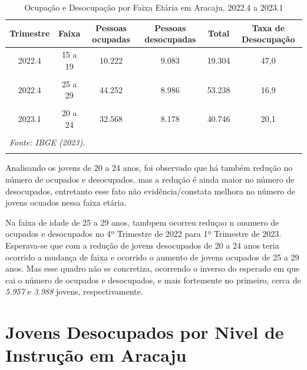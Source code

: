 \documentclass[
  12pt,
  a4paper,
]{article}
\begin{document}
\begin{longtable}[t]{cccccc}
\caption{\label{tab:tab8}\label{tab8}Ocupação e Desocupação por Faixa Etária em Aracaju, 2022.4 a 2023.1}\\
\toprule
Trimestre & Faixa & Pessoas ocupadas & Pessoas desocupadas & Total & Taxa de Desocupação\\
\midrule
2022.4 & 15 a 19 & 10.222 & 9.083 & 19.304 & 47,0\\
\cellcolor[HTML]{DCDCDC}{2022.4} & \cellcolor[HTML]{DCDCDC}{20 a 24} & \cellcolor[HTML]{DCDCDC}{32.571} & \cellcolor[HTML]{DCDCDC}{10.620} & \cellcolor[HTML]{DCDCDC}{43.191} & \cellcolor[HTML]{DCDCDC}{24,6}\\
2022.4 & 25 a 29 & 44.252 & 8.986 & 53.238 & 16,9\\
\cellcolor[HTML]{DCDCDC}{2023.1} & \cellcolor[HTML]{DCDCDC}{15 a 19} & \cellcolor[HTML]{DCDCDC}{7.938} & \cellcolor[HTML]{DCDCDC}{7.273} & \cellcolor[HTML]{DCDCDC}{15.211} & \cellcolor[HTML]{DCDCDC}{47,8}\\
2023.1 & 20 a 24 & 32.568 & 8.178 & 40.746 & 20,1\\
\addlinespace
\cellcolor[HTML]{DCDCDC}{2023.1} & \cellcolor[HTML]{DCDCDC}{25 a 29} & \cellcolor[HTML]{DCDCDC}{38.295} & \cellcolor[HTML]{DCDCDC}{4.998} & \cellcolor[HTML]{DCDCDC}{43.292} & \cellcolor[HTML]{DCDCDC}{11,5}\\
\bottomrule
\multicolumn{6}{l}{\rule{0pt}{1em}\textit{Fonte: IBGE (2023).}}\\
\multicolumn{6}{l}{\rule{0pt}{1em}}\\
\end{longtable}
\endgroup{}

Analisando os jovens de 20 a 24 anos, foi observado que há também
redução no número de ocupados e desocupados, mas a redução é ainda maior
no número de desocupados, entretanto esse fato não evidência/constata
melhora no número de jovens ocuados nessa faixa etária.

Na faixa de idade de 25 a 29 anos, tambpem ocorreu reduçao n onumero de
ocupados e desocupados no 4º Trimestre de 2022 para 1º Trimestre de
2023. Esperava-se que com a redução de jovens desocupados de 20 a 24
anos teria ocorrido a mudança de faixa e ocorrido o aumento de jovens
ocupados de 25 a 29 anos. Mas esse quadro não se concretiza, ocorrendo o
inverso do esperado em que cai o número de ocupados e desocupados, e
mais fortemente no primeiro, cerca de \emph{5.957} e \emph{3.988}
jovens, respectivamente.

\hypertarget{jovens-desocupados-por-nivel-de-instruuxe7uxe3o-em-aracaju}{%
\section{Jovens Desocupados por Nivel de Instrução em
Aracaju}\label{jovens-desocupados-por-nivel-de-instruuxe7uxe3o-em-aracaju}}
\end{document}
